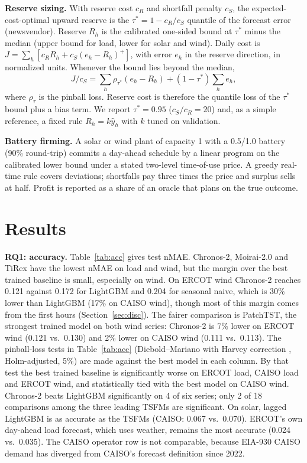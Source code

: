 \documentclass[conference]{IEEEtran}
\begin{document}
\textbf{Reserve sizing.} With reserve cost $c_R$ and shortfall penalty $c_S$, the expected-cost-optimal upward reserve is the $\tau^*=1-c_R/c_S$ quantile of the forecast error (newsvendor). Reserve $R_h$ is the calibrated one-sided bound at $\tau^*$ minus the median (upper bound for load, lower for solar and wind). Daily cost is $J=\sum_h [c_R R_h + c_S (e_h-R_h)^+]$, with error $e_h$ in the reserve direction, in normalized units. Whenever the bound lies beyond the median,
\begin{equation}
J/c_S=\textstyle\sum_h \rho_{\tau^*}(e_h-R_h)+(1-\tau^*)\sum_h e_h,
\label{eq:decomp}
\end{equation}
where $\rho_\tau$ is the pinball loss. Reserve cost is therefore the quantile loss of the $\tau^*$ bound plus a bias term. We report $\tau^*=0.95$ ($c_S/c_R=20$) and, as a simple reference, a fixed rule $R_h=k\hat y_h$ with $k$ tuned on validation.

\textbf{Battery firming.} A solar or wind plant of capacity 1 with a 0.5/1.0 battery (90\% round-trip) commits a day-ahead schedule by a linear program on the calibrated lower bound under a stated two-level time-of-use price. A greedy real-time rule covers deviations; shortfalls pay three times the price and surplus sells at half. Profit is reported as a share of an oracle that plans on the true outcome.

\section{Results}
\textbf{RQ1: accuracy.} Table~\ref{tab:acc} gives test nMAE. Chronos-2, Moirai-2.0 and TiRex have the lowest nMAE on load and wind, but the margin over the best trained baseline is small, especially on wind. On ERCOT wind Chronos-2 reaches 0.121 against 0.172 for LightGBM and 0.204 for seasonal naive, which is 30\% lower than LightGBM (17\% on CAISO wind), though most of this margin comes from the first hours (Section~\ref{sec:disc}). The fairer comparison is PatchTST, the strongest trained model on both wind series: Chronos-2 is 7\% lower on ERCOT wind (0.121 vs.\ 0.130) and 2\% lower on CAISO wind (0.111 vs.\ 0.113). The pinball-loss tests in Table~\ref{tab:acc} (Diebold--Mariano with Harvey correction \cite{diebold1995dm,harvey1997hln}, Holm-adjusted, 5\%) are made against the best model in each column. By that test the best trained baseline is significantly worse on ERCOT load, CAISO load and ERCOT wind, and statistically tied with the best model on CAISO wind. Chronos-2 beats LightGBM significantly on 4 of six series; only 2 of 18 comparisons among the three leading TSFMs are significant. On solar, lagged LightGBM is as accurate as the TSFMs (CAISO: 0.067 vs.\ 0.070). ERCOT's own day-ahead load forecast, which uses weather, remains the most accurate (0.024 vs.\ 0.035). The CAISO operator row is not comparable, because EIA-930 CAISO demand has diverged from CAISO's forecast definition since 2022.
\end{document}
